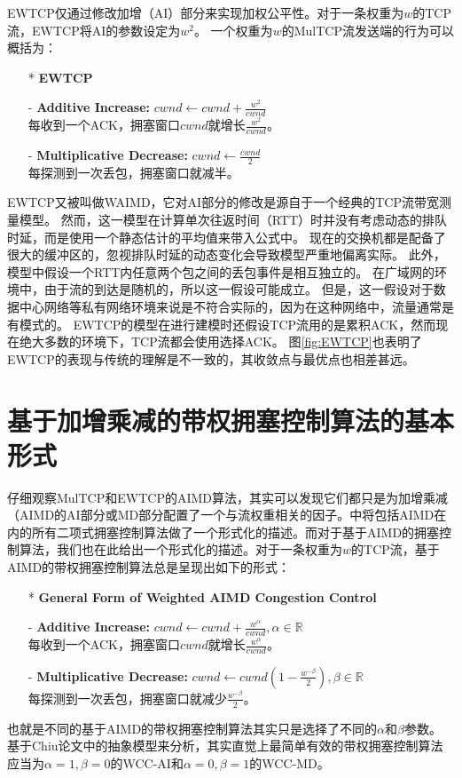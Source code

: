 \documentclass[winfonts]{njuthesis}
\begin{document}
EWTCP仅通过修改加增（AI）部分来实现加权公平性。对于一条权重为$w$的TCP流，EWTCP将AI的参数设定为$w^2$。
一个权重为$w$的MulTCP流发送端的行为可以概括为：

\begin{itemize}
  \item[*] \textbf{\large EWTCP}
  \item[-] {\bf Additive Increase:} $cwnd \leftarrow cwnd + \frac{w^2}{cwnd}$ \\
  每收到一个ACK，拥塞窗口$cwnd$就增长$\frac{w^2}{cwnd}$。
  \item[-] {\bf Multiplicative Decrease:} $cwnd \leftarrow \frac{cwnd}{2}$ \\
  每探测到一次丢包，拥塞窗口就减半。
\end{itemize}

EWTCP又被叫做WAIMD\cite{Honda2009EWTCP}，它对AI部分的修改是源自于一个经典的TCP流带宽测量模型\cite{padhye1998modeling}。
然而，这一模型在计算单次往返时间（RTT）时并没有考虑动态的排队时延，而是使用一个静态估计的平均值来带入公式中。
现在的交换机都是配备了很大的缓冲区的\cite{Jim2012Bufferbloat}，忽视排队时延的动态变化会导致模型严重地偏离实际。
此外，模型中假设一个RTT内任意两个包之间的丢包事件是相互独立的。
在广域网的环境中，由于流的到达是随机的，所以这一假设可能成立。
但是，这一假设对于数据中心网络等私有网络环境来说是不符合实际的，因为在这种网络中，流量通常是有模式的。
EWTCP的模型在进行建模时还假设TCP流用的是累积ACK，然而现在绝大多数的环境下，TCP流都会使用选择ACK。
图\ref{fig:EWTCP}也表明了EWTCP的表现与传统的理解是不一致的，其收敛点与最优点也相差甚远。

\section{基于加增乘减的带权拥塞控制算法的基本形式}

仔细观察MulTCP和EWTCP的AIMD算法，其实可以发现它们都只是为加增乘减（AIMD的AI部分或MD部分配置了一个与流权重相关的因子。\cite{bansal2001binomial}中将包括AIMD在内的所有二项式拥塞控制算法做了一个形式化的描述。而对于基于AIMD的拥塞控制算法，我们也在此给出一个形式化的描述。对于一条权重为$w$的TCP流，基于AIMD的带权拥塞控制算法总是呈现出如下的形式：

\begin{itemize}
  \item[*] \textbf{\large General Form of Weighted AIMD Congestion Control}
  \item[-] {\bf Additive Increase:} $cwnd \leftarrow cwnd + \frac{w^\alpha}{cwnd}, \alpha \in \mathbb{R}$ \\
  每收到一个ACK，拥塞窗口$cwnd$就增长$\frac{w^\alpha}{cwnd}$。
  \item[-] {\bf Multiplicative Decrease:} $cwnd \leftarrow cwnd (1 - \frac{w^{-\beta}}{2}), \beta \in \mathbb{R}$ \\
  每探测到一次丢包，拥塞窗口就减少$\frac{w^{-\beta}}{2}$。
\end{itemize}
也就是不同的基于AIMD的带权拥塞控制算法其实只是选择了不同的$\alpha$和$\beta$参数。
基于Chiu论文\cite{chiu1989analysis}中的抽象模型来分析，其实直觉上最简单有效的带权拥塞控制算法应当为$\alpha=1,\beta=0$的WCC-AI和$\alpha=0,\beta=1$的WCC-MD。
\end{document}
